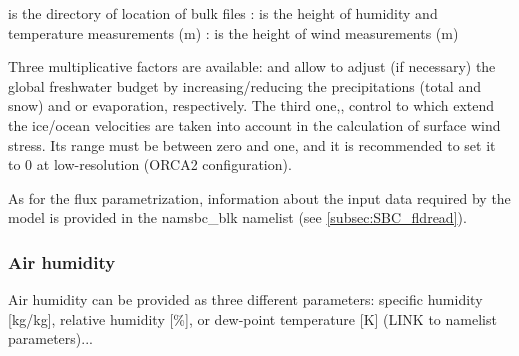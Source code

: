 \documentclass[../main/NEMO_manual]{subfiles}
\begin{document}
 is the directory of location of bulk files
: is the height of humidity and temperature measurements (m)
: is the height of wind measurements (m)

Three multiplicative factors are available:
 and  allow to adjust (if necessary) the global freshwater budget by
increasing/reducing the precipitations (total and snow) and or evaporation, respectively.
The third one,, control to which extend the ice/ocean velocities are taken into account in
the calculation of surface wind stress.
Its range must be between zero and one, and it is recommended to set it to 0 at low-resolution (ORCA2 configuration).

As for the flux parametrization, information about the input data required by the model is provided in
the namsbc\_blk namelist (see \autoref{subsec:SBC_fldread}).


\subsubsection{Air humidity}

Air humidity can be provided as three different parameters: specific humidity
[kg/kg], relative humidity [\%], or dew-point temperature [K] (LINK to namelist
parameters)...


~\\










\end{document}
